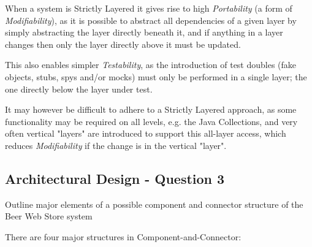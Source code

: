 When a system is Strictly Layered it gives rise to high \emph{Portability} (a form of \emph{Modifiability}), as it is possible to abstract all dependencies of a given layer by simply abstracting the layer directly beneath it, and if anything in a layer changes then only the layer directly above it must be updated.

This also enables simpler \emph{Testability}, as the introduction of test doubles (fake objects, stubs, spys and/or mocks) must only be performed in a single layer; the one directly below the layer under test.

It may however be difficult to adhere to a Strictly Layered approach, as some functionality may be required on all levels, e.g. the Java Collections, and very often vertical "layers" are introduced to support this all-layer access, which reduces \emph{Modifiability} if the change is in the vertical "layer".

\subsection{Architectural Design - Question 3}

\begin{question}
Outline major elements of a possible component and connector
structure of the Beer Web Store system
\end{question}

There are four major structures in Component-and-Connector:

